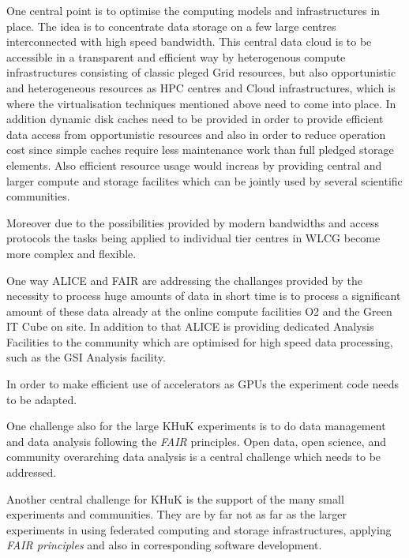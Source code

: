 One central point is to optimise the computing models and infrastructures in place.
The idea is to concentrate data storage on a few large centres interconnected with high speed bandwidth.
This central data cloud is to be accessible in a transparent and efficient way by heterogenous compute infrastructures 
consisting of classic pleged Grid resources, but also opportunistic and heterogeneous resources as HPC centres and Cloud infrastructures,
which is where the virtualisation techniques mentioned above need to come into place.
In addition dynamic disk caches need to be provided in order to provide efficient data access from opportunistic resources and also
in order to reduce operation cost since simple caches require less maintenance work than full pledged storage elements.
Also efficient resource usage would increas by providing central and larger compute and storage facilites which can be jointly used by
several scientific communities.

Moreover due to the possibilities provided by modern bandwidths and access protocols the tasks being applied
to individual tier centres in WLCG become more complex and flexible.

One way ALICE and FAIR are addressing the challanges provided by the necessity to process huge amounts of data
in short time is to process a significant amount of these data already at the online compute facilities O2 and the Green IT Cube on site.
In addition to that ALICE is providing dedicated Analysis Facilities to the community which are optimised for high speed data processing,
such as the GSI Analysis facility.

In order to make efficient use of accelerators as GPUs the experiment code needs to be adapted.

One challenge also for the large KHuK experiments is to do data management and data analysis following the {\em FAIR} principles.
Open data, open science, and community overarching data analysis is a central challenge which needs to be addressed.

Another central challenge for KHuK is the support of the many small experiments and communities.
They are by far not as far as the larger experiments in using federated computing and storage infrastructures,
applying {\em FAIR principles} and also in corresponding software development.

